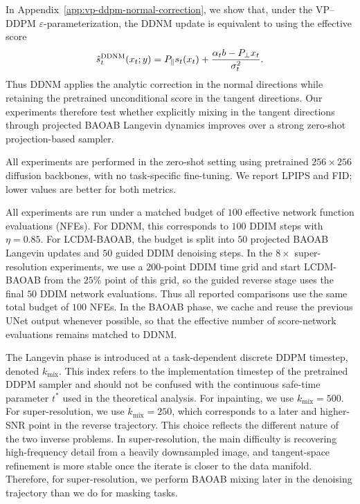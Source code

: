 \documentclass[twoside,11pt]{article}
\numberwithin{equation}{section}
\begin{document}
In Appendix~\ref{app:vp-ddpm-normal-correction}, we show that, under the VP--DDPM
\(\varepsilon\)-parameterization, the DDNM update is equivalent to using the
effective score
\[
\hat s_t^{\rm DDNM}(x_t;y)
=
P_\parallel s_t(x_t)
+
\frac{\alpha_t b-P_\perp x_t}{\sigma_t^2}.
\]
Thus DDNM applies the analytic correction in the normal directions while
retaining the pretrained unconditional score in the tangent directions. Our
experiments therefore test whether explicitly mixing in the tangent directions
through projected BAOAB Langevin dynamics improves over a strong zero-shot
projection-based sampler.


All experiments are performed in the zero-shot setting using pretrained
\(256\times256\) diffusion backbones, with no task-specific fine-tuning. We
report LPIPS and FID; lower values are better for both metrics.

All experiments are run under a matched budget of \(100\) effective network
function evaluations (NFEs). For DDNM, this corresponds to \(100\) DDIM steps
with \(\eta=0.85\). For LCDM-BAOAB, the budget is split into \(50\) projected
BAOAB Langevin updates and \(50\) guided DDIM denoising steps. In the
\(8\times\) super-resolution experiments, we use a \(200\)-point DDIM time grid
and start LCDM-BAOAB from the \(25\%\) point of this grid, so the guided reverse
stage uses the final \(50\) DDIM network evaluations. Thus all reported
comparisons use the same total budget of \(100\) NFEs. In the BAOAB phase, we cache and reuse the previous
UNet output whenever possible, so that the effective number of score-network
evaluations remains matched to DDNM.

The Langevin phase is introduced at a task-dependent discrete DDPM timestep,
denoted \(k_{\mathrm{mix}}\). This index refers to the implementation timestep
of the pretrained DDPM sampler and should not be confused with the continuous
safe-time parameter \(t^*\) used in the theoretical analysis. For inpainting, we
use \(k_{\mathrm{mix}}=500\). For super-resolution, we use
\(k_{\mathrm{mix}}=250\), which corresponds to a later and higher-SNR point in
the reverse trajectory. This choice reflects the different nature of the two
inverse problems. In super-resolution, the main difficulty is recovering
high-frequency detail from a heavily downsampled image, and tangent-space
refinement is more stable once the iterate is closer to the data manifold.
Therefore, for super-resolution, we perform BAOAB mixing later in the denoising
trajectory than we do for masking tasks.
\end{document}
